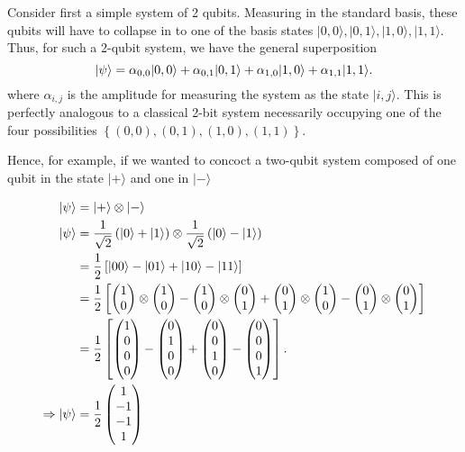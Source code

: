 Consider first a simple system of 2 qubits. Measuring in the standard basis, these qubits will have to collapse in to one of the basis states $|0,0 \rangle, |0,1 \rangle, |1,0\rangle, |1,1\rangle $. Thus, for such a 2-qubit system, we have the general superposition
$$ \ket{\psi} = \alpha_{0,0} |0,0 \rangle + \alpha_{0,1}|0,1 \rangle + \alpha_{1,0} |1,0\rangle +\alpha_{1,1} |1,1\rangle. $$ 
where $\alpha_{i,j}$ is the amplitude for measuring the system as the state $|i,j\rangle $. 
This is perfectly analogous to a classical 2-bit system necessarily occupying one of the four possibilities $\left\{ (0,0), (0,1), (1,0), (1,1) \right\}$.

Hence, for example, if we wanted to concoct a two-qubit system composed of one qubit in the state $|+\rangle$ and one in $|-\rangle$

\begin{equation}
    \begin{split}
    \ket{\psi} &= |+\rangle \otimes |-\rangle 
    \\ \ket{\psi} &=  \frac{1}{\sqrt{2}} \left( \ket{0} + \ket{1} \right) \otimes  \frac{1}{\sqrt{2}} \left( \ket{0} - \ket{1} \right)
    \\ &= \frac{1}{2} \left[ \ket{00} - \ket{01} + \ket{10} - \ket{11} \right] 
    \\ &= \frac{1}{2} \left[ \left(\begin{matrix}1\\0\end{matrix}\right) \otimes \left(\begin{matrix}1\\0\end{matrix}\right) - \left(\begin{matrix}1\\0\end{matrix}\right) \otimes \left(\begin{matrix}0\\1\end{matrix}\right) + \left(\begin{matrix}0\\1\end{matrix}\right) \otimes \left(\begin{matrix}1\\0\end{matrix}\right) - \left(\begin{matrix}0\\1\end{matrix}\right) \otimes \left(\begin{matrix}0\\1\end{matrix}\right) \right]
    \\ &= \frac{1}{2} \left[ \left(\begin{matrix}1\\0\\0\\0\end{matrix}\right) - \left(\begin{matrix}0\\1\\0\\0\end{matrix}\right) + \left(\begin{matrix}0\\0\\1\\0\end{matrix}\right) - \left(\begin{matrix}0\\0\\0\\1\end{matrix}\right) \right].
    \\ \Rightarrow \ket{\psi} &= \frac{1}{2} \left(\begin{matrix}1\\-1\\-1\\1\end{matrix}\right) 
    \end{split}
\end{equation}

